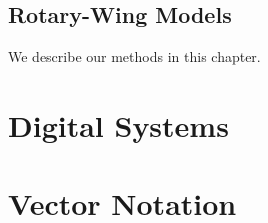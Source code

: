 \documentclass[
]{book}
\theoremstyle{definition}
\theoremstyle{definition}
\theoremstyle{definition}
\theoremstyle{remark}
\begin{document}
\hypertarget{rotary-wing-models}{%
\section{Rotary-Wing Models}\label{rotary-wing-models}}

We describe our methods in this chapter.

\hypertarget{refs}{}

\hypertarget{appendix-appendix}{%
\appendix}


\hypertarget{digital-systems}{%
\chapter{Digital Systems}\label{digital-systems}}

\hypertarget{vector-notation}{%
\chapter{Vector Notation}\label{vector-notation}}

  
\end{document}
